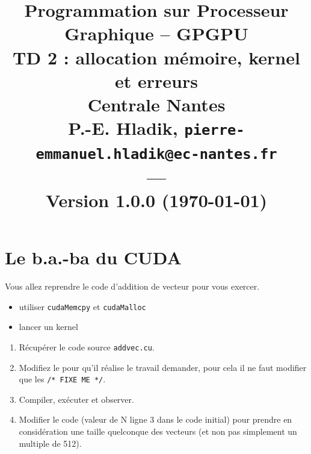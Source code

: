 

\title{{\Large Programmation sur Processeur Graphique -- GPGPU }\\
\vspace{-0.4em}
{\large TD 2 : allocation mémoire, kernel et erreurs}\\
{\small Centrale Nantes}\\
\small P.-E. Hladik, \small{\texttt{pierre-emmanuel.hladik@ec-nantes.fr}}\\
---\\
{\scriptsize  Version 1.0.0 (\today)}\\
}




\maketitle



  \section{Le b.a.-ba du CUDA}

Vous allez reprendre le code d'addition de vecteur pour vous exercer.

\begin{objectif}[]{}
 \begin{itemize}
	\item utiliser {\tt cudaMemcpy} et {\tt cudaMalloc}
	\item lancer un kernel
\end{itemize}
\end{objectif}

\begin{wtodo}{}
\begin{enumerate}
\item Récupérer le code source {\tt addvec.cu}.
\item Modifiez le pour qu'il réalise le travail demander, pour cela il ne faut modifier que les \texttt{/* FIXE ME */}.
\item Compiler, exécuter et observer.
\item Modifier le code (valeur de N ligne 3 dans le code initial) pour prendre en considération une taille quelconque des vecteurs (et non pas simplement un multiple de 512).
\end{enumerate}
\end{wtodo}


